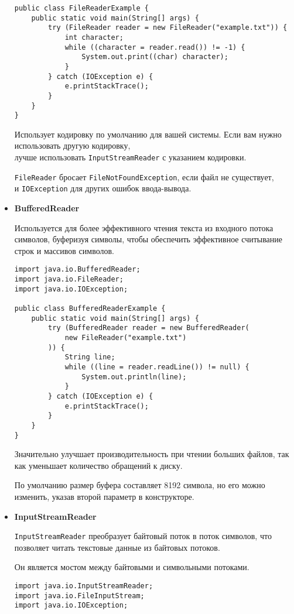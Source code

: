 \begin{itemize}
\begin{verbatim}
public class FileReaderExample {
    public static void main(String[] args) {
        try (FileReader reader = new FileReader("example.txt")) {
            int character;
            while ((character = reader.read()) != -1) {
                System.out.print((char) character);
            }
        } catch (IOException e) {
            e.printStackTrace();
        }
    }
}
    \end{verbatim}
    Использует кодировку по умолчанию для вашей системы.\newline
    Если вам нужно использовать другую кодировку, \\ лучше использовать \texttt{InputStreamReader} с указанием кодировки. \par
    \texttt{FileReader} бросает \texttt{FileNotFoundException}, если файл не существует,\\ и \texttt{IOException} для других ошибок ввода-вывода.

    \item \textbf{BufferedReader} \par
    Используется для более эффективного чтения текста из входного потока символов, буферизуя символы, чтобы обеспечить эффективное считывание строк и массивов символов. \par
    \begin{verbatim}
import java.io.BufferedReader;
import java.io.FileReader;
import java.io.IOException;

public class BufferedReaderExample {
    public static void main(String[] args) {
        try (BufferedReader reader = new BufferedReader(
            new FileReader("example.txt")
        )) {
            String line;
            while ((line = reader.readLine()) != null) {
                System.out.println(line);
            }
        } catch (IOException e) {
            e.printStackTrace();
        }
    }
}
    \end{verbatim}
    Значительно улучшает производительность при чтении больших файлов, так как уменьшает количество обращений к диску. \par
    По умолчанию размер буфера составляет 8192 символа, но его можно изменить, указав второй параметр в конструкторе.
    
    \item \textbf{InputStreamReader} \par
    \texttt{InputStreamReader} преобразует байтовый поток в поток символов, что позволяет читать текстовые данные из байтовых потоков. \par
    Он является мостом между байтовыми и символьными потоками.
    \begin{verbatim}
import java.io.InputStreamReader;
import java.io.FileInputStream;
import java.io.IOException;


\end{verbatim}
\end{itemize}
